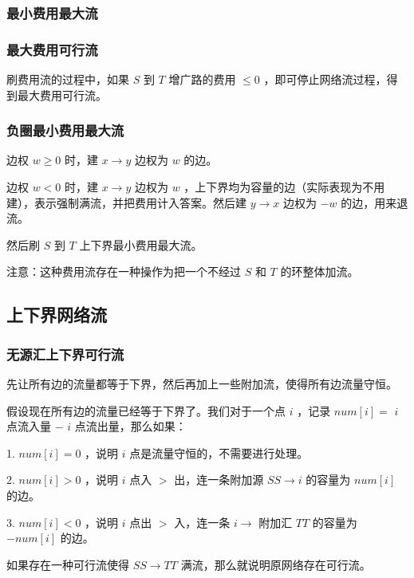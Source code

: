 \subsubsection{最小费用最大流}



\subsubsection{最大费用可行流}

刷费用流的过程中，如果 $S$ 到 $T$ 增广路的费用 $\le 0$ ，即可停止网络流过程，得到最大费用可行流。

\subsubsection{负圈最小费用最大流}

边权 $w\ge 0$ 时，建 $x\to y$ 边权为 $w$ 的边。

边权 $w<0$ 时，建 $x\to y$ 边权为 $w$ ，上下界均为容量的边（实际表现为不用建），表示强制满流，并把费用计入答案。然后建 $y\to x$ 边权为 $-w$ 的边，用来退流。

然后刷 $S$ 到 $T$ 上下界最小费用最大流。

注意：这种费用流存在一种操作为把一个不经过 $S$ 和 $T$ 的环整体加流。



\subsection{上下界网络流}

\subsubsection{无源汇上下界可行流}

先让所有边的流量都等于下界，然后再加上一些附加流，使得所有边流量守恒。

假设现在所有边的流量已经等于下界了。我们对于一个点 $i$ ，记录 $num[i]=$ $i$ 点流入量 $-$ $i$ 点流出量，那么如果：

1. $num[i]=0$ ，说明 $i$ 点是流量守恒的，不需要进行处理。

2. $num[i]>0$ ，说明 $i$ 点入 $>$ 出，连一条附加源 $SS\to i$ 的容量为 $num[i]$ 的边。

3. $num[i]<0$ ，说明 $i$ 点出 $>$ 入，连一条 $i\to$ 附加汇 $TT$ 的容量为 $-num[i]$ 的边。

如果存在一种可行流使得 $SS\to TT$ 满流，那么就说明原网络存在可行流。

